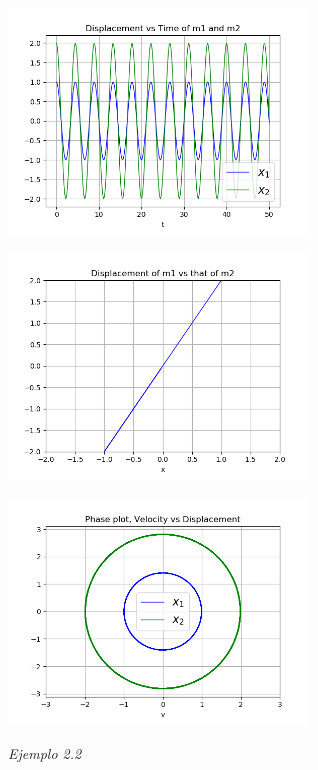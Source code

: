 \documentclass[a4paper]{article}
\begin{document}
\begin{center}
\includegraphics[height=6cm]{ejemplo2-1.png}

\includegraphics[height=6cm]{recta2-1.png}

\includegraphics[height=6cm]{circulo2-1.png}

\end{center}

\textit{Ejemplo 2.2}
\end{document}
